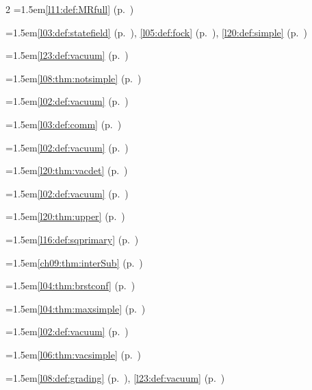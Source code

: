 \begin{multicols}{2}
\hangindent=1.5em\quad \ref{l11:def:MRfull} (p.~\pageref{l11:def:MRfull})\par
\hangindent=1.5em\quad \ref{l03:def:statefield} (p.~\pageref{l03:def:statefield}), \ref{l05:def:fock} (p.~\pageref{l05:def:fock}), \ref{l20:def:simple} (p.~\pageref{l20:def:simple})\par
\hangindent=1.5em\quad \ref{l23:def:vacuum} (p.~\pageref{l23:def:vacuum})\par
\hangindent=1.5em\quad \ref{l08:thm:notsimple} (p.~\pageref{l08:thm:notsimple})\par
\hangindent=1.5em\quad \ref{l02:def:vacuum} (p.~\pageref{l02:def:vacuum})\par
\hangindent=1.5em\quad \ref{l03:def:comm} (p.~\pageref{l03:def:comm})\par
\hangindent=1.5em\quad \ref{l02:def:vacuum} (p.~\pageref{l02:def:vacuum})\par
\hangindent=1.5em\quad \ref{l20:thm:vacdet} (p.~\pageref{l20:thm:vacdet})\par
\hangindent=1.5em\quad \ref{l02:def:vacuum} (p.~\pageref{l02:def:vacuum})\par
\hangindent=1.5em\quad \ref{l20:thm:upper} (p.~\pageref{l20:thm:upper})\par
\hangindent=1.5em\quad \ref{l16:def:sqprimary} (p.~\pageref{l16:def:sqprimary})\par
\hangindent=1.5em\quad \ref{ch09:thm:interSub} (p.~\pageref{ch09:thm:interSub})\par
\hangindent=1.5em\quad \ref{l04:thm:brstconf} (p.~\pageref{l04:thm:brstconf})\par
\hangindent=1.5em\quad \ref{l04:thm:maxsimple} (p.~\pageref{l04:thm:maxsimple})\par
\hangindent=1.5em\quad \ref{l02:def:vacuum} (p.~\pageref{l02:def:vacuum})\par
\hangindent=1.5em\quad \ref{l06:thm:vacsimple} (p.~\pageref{l06:thm:vacsimple})\par
\hangindent=1.5em\quad \ref{l08:def:grading} (p.~\pageref{l08:def:grading}), \ref{l23:def:vacuum} (p.~\pageref{l23:def:vacuum})\par

\end{multicols}
